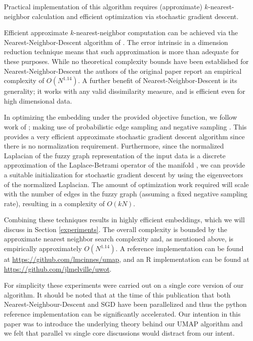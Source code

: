 \documentclass[12pt]{article}
\begin{document}
Practical implementation of this algorithm requires (approximate) $k$-nearest-neighbor calculation and efficient optimization via stochastic gradient descent. 

Efficient approximate $k$-nearest-neighbor computation can be achieved via the Nearest-Neighbor-Descent algorithm of \cite{DongNearestNeighbour}. The error intrinsic in a dimension reduction technique means that such approximation is more than adequate for these purposes. While no theoretical complexity bounds have been established for Nearest-Neighbor-Descent the authors of the original paper report an empirical complexity of $O(N^{1.14})$. A further benefit of Nearest-Neighbor-Descent is its generality; it works with any valid dissimilarity measure, and is efficient even for high dimensional data.

In optimizing the embedding under the provided objective function, we follow work of \cite{tang2016visualizing}; making use of probabilistic edge sampling and negative sampling \cite{mikolov2013distributed}. This provides a very efficient approximate stochastic gradient descent algorithm since there is no normalization requirement. Furthermore, since the normalized Laplacian of the fuzzy graph representation of the input data is a discrete approximation of the Laplace-Betrami operator of the manifold \cite[see][]{belkin2002laplacian, belkin2003laplacian}, we can provide a suitable initialization for stochastic gradient descent by using the eigenvectors of the normalized Laplacian. The amount of optimization work required will scale with the number of edges in the fuzzy graph (assuming a fixed negative sampling rate), resulting in a complexity of $O(kN)$.

Combining these techniques results in highly efficient embeddings, which we will discuss in Section \ref{experiments}. The overall complexity is bounded by the approximate nearest neighbor search complexity and, as mentioned above, is empirically approximately $O(N^{1.14})$. A reference implementation can be found at \url{https://github.com/lmcinnes/umap}, and an R implementation can be found at \url{https://github.com/jlmelville/uwot}.

For simplicity these experiments were carried out on a single core version of our algorithm.  It should be noted that at the time of this publication that both Nearest-Neighbour-Descent and SGD have been parallelized and thus the python reference implementation can be significantly accelerated.   Our intention in this paper was to introduce the underlying theory behind our UMAP algorithm and we felt that parallel vs single core discussions would distract from our intent.
\end{document}

